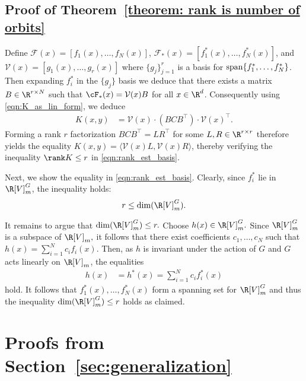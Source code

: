 \subsection{Proof of Theorem~\ref{theorem: rank is number of orbits}} 
 Define $\mathcal{F}(x)=[f_1(x),\ldots,f_N(x)]$, $\mathcal{F}_*(x)=[f_1^*(x),\ldots,f^*_N(x)]$, and
$\mathcal{V}(x)=[g_1(x),\ldots, g_r(x)]$ 
where $\{g_j\}_{j=1}^r$ is a basis for ${\rm span}\{f_1^*, \ldots, f_N^*\}$. Then expanding $f_i^*$ in the $\{g_j\}$ basis we deduce that there exists a matrix $B\in \R^{r\times N}$ such that  $\cF_*(x)=\mathcal{V}(x)B$ for all $x\in\R^d$. Consequently using \eqref{eqn:K_as_lin_form}, we deduce 
\begin{align*}
K(x,y)&=\mathcal{V}(x)\cdot (BCB^\top) \cdot\mathcal{V}(x)^\top.
\end{align*}
Forming a rank $r$ factorization $BCB^\top=LR^\top$ for some $L,R\in\R^{r\times r}$ therefore yields the equality $K(x,y)=\langle \mathcal{V}(x)L,\mathcal{V}(x)R\rangle$, thereby verifying the inequality $\rank K\leq r$ in \eqref{eqn:rank_est_basis}. 

Next, we show the equality in \eqref{eqn:rank_est_basis}. Clearly, since $f_i^*$ lie in $\R[V]_m^G$, the inequality holds:
\begin{equation}\label{eqn:invar_space_lower}
r\leq\dim(\R[V]_m^G).
\end{equation}

It remains to argue that $\dim(\R[V]_m^G)\leq r.$ Choose $h(x) \in\R[V]_m^G.$ Since $\R[V]_m^G$ is a subspace of $\R[V]_m,$ it follows that there exist coefficients $c_1, \ldots, c_N$ such that $h(x) = \sum_{i=1}^Nc_i f_i(x).$ Then, as $h$ is invariant under the action of $G$ and $G$ acts linearly on $\R[V]_m$, the equalities 
\begin{align*}
    h(x) &= h^*(x) = \sum_{i=1}^Nc_if_i^*(x)
\end{align*}
hold. It follows that $f_1^*(x), \ldots, f_N^*(x)$ form a spanning set for $\R[V]_m^G$ and thus the inequality $\dim(\R[V]_m^G)\leq r$ holds as claimed.

\section{Proofs from Section~\ref{sec:generalization}} \label{app:generalization}

